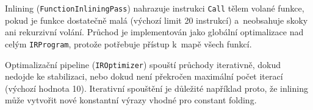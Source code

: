 Inlining (\texttt{FunctionInliningPass}) nahrazuje instrukci \texttt{Call} tělem
volané funkce, pokud je funkce dostatečně malá (výchozí limit 20 instrukcí)
a~neobsahuje skoky ani rekurzivní volání. Průchod je implementován jako
globální optimalizace nad celým \texttt{IRProgram}, protože potřebuje přístup
k~mapě všech funkcí.

Optimalizační pipeline (\texttt{IROptimizer}) spouští průchody iterativně, dokud
nedojde ke stabilizaci, nebo dokud není překročen maximální počet iterací
(výchozí hodnota 10). Iterativní spouštění je důležité například proto, že
inlining může vytvořit nové konstantní výrazy vhodné pro constant folding.
